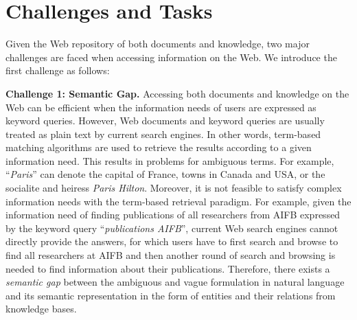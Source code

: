 \section{Challenges and Tasks} \label{sec:challenges}


Given the Web repository of both documents and knowledge, two major challenges are faced when accessing information on the Web. We introduce the first challenge as follows: 

\noindent  \textbf{Challenge 1: Semantic Gap.} 
Accessing both documents and knowledge on the Web can be efficient when the information needs of users are expressed as keyword queries.
However, Web documents and keyword queries are usually treated as plain text by current search engines. In other words, term-based matching algorithms are used to retrieve the results according to a given information need. This results in problems for ambiguous terms. For example, ``\emph{Paris}'' can denote the capital of France, towns in Canada and USA, or the socialite and heiress \emph{Paris Hilton}. 
Moreover, it is not feasible to satisfy complex information needs with the term-based retrieval paradigm. For example, given the information need of finding publications of all researchers from AIFB expressed by the keyword query ``\emph{publications AIFB}'', current Web search engines cannot directly provide the answers, for which users have to first search and browse to find all researchers at AIFB and then another round of search and browsing is needed to find information about their publications.
Therefore, there exists a \emph{semantic gap} between the ambiguous and vague formulation in natural language
and its semantic representation 
in the form of entities and their relations from knowledge bases. 

